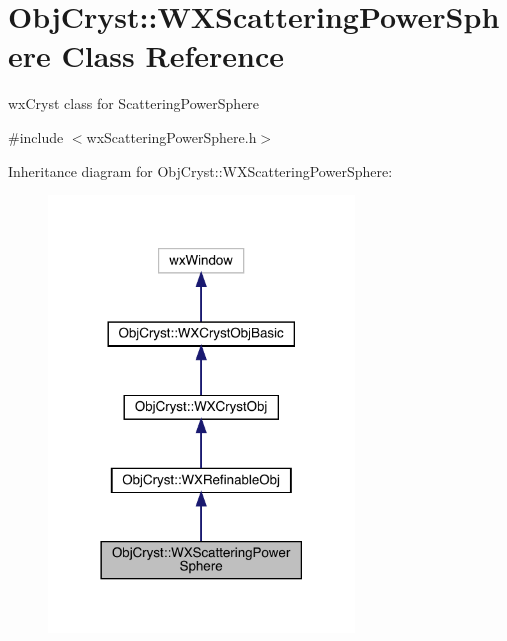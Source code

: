 \hypertarget{class_obj_cryst_1_1_w_x_scattering_power_sphere}{}\section{Obj\+Cryst\+::W\+X\+Scattering\+Power\+Sphere Class Reference}
\label{class_obj_cryst_1_1_w_x_scattering_power_sphere}


wx\+Cryst class for Scattering\+Power\+Sphere  




{\ttfamily \#include $<$wx\+Scattering\+Power\+Sphere.\+h$>$}



Inheritance diagram for Obj\+Cryst\+::W\+X\+Scattering\+Power\+Sphere\+:
\nopagebreak
\begin{figure}[H]
\begin{center}
\leavevmode
\includegraphics[width=230pt]{class_obj_cryst_1_1_w_x_scattering_power_sphere__inherit__graph}
\end{center}
\end{figure}


